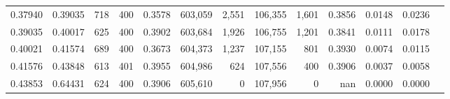 \begin{tabular}{rrrrrrrrrrrrr}
0.37940 & 0.39035 &    718 & 400 &                                     0.3578 & 603,059 &   2,551 & 106,355 &   1,601 & 0.3856 & 0.0148 & 0.0236 \\
0.39035 & 0.40017 &    625 & 400 &                                     0.3902 & 603,684 &   1,926 & 106,755 &   1,201 & 0.3841 & 0.0111 & 0.0178 \\
0.40021 & 0.41574 &    689 & 400 &                                     0.3673 & 604,373 &   1,237 & 107,155 &     801 & 0.3930 & 0.0074 & 0.0115 \\
0.41576 & 0.43848 &    613 & 401 &                                     0.3955 & 604,986 &     624 & 107,556 &     400 & 0.3906 & 0.0037 & 0.0058 \\
0.43853 & 0.64431 &    624 & 400 &                                     0.3906 & 605,610 &       0 & 107,956 &       0 &    nan & 0.0000 & 0.0000 \\
\bottomrule
\end{tabular}
